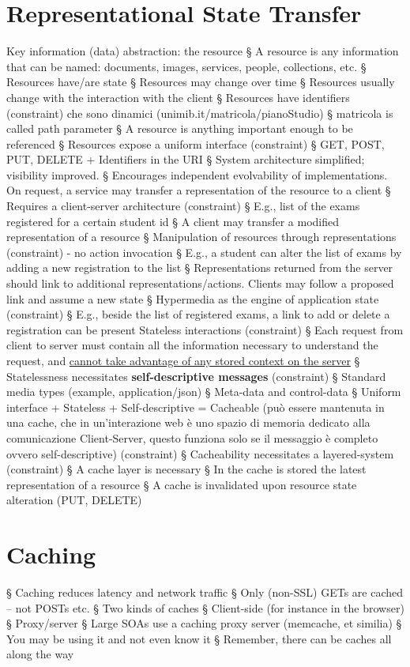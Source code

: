 \section{Representational State Transfer}
Key information (data) abstraction: the resource
§ A resource is any information that can be named: documents, images, services, people, collections, etc.
§ Resources have/are state
§ Resources may change over time
§ Resources usually change with the interaction with the client
§ Resources have identifiers (constraint) che sono dinamici (unimib.it/{matricola}/pianoStudio)
§ {matricola} is called path parameter
§ A resource is anything important enough to be referenced
§ Resources expose a uniform interface (constraint)
§ GET, POST, PUT, DELETE + Identifiers in the URI
§ System architecture simplified; visibility improved.
§ Encourages independent evolvability of implementations.
On request, a service may transfer a representation of the resource to a client
§ Requires a client-server architecture (constraint)
§ E.g., list of the exams registered for a certain student id
§ A client may transfer a modified representation of a resource
§ Manipulation of resources through representations (constraint) - no action invocation
§ E.g., a student can alter the list of exams by adding a new registration to the list
§ Representations returned from the server should link to additional representations/actions. Clients may
follow a proposed link and assume a new state
§ Hypermedia as the engine of application state (constraint)
§ E.g., beside the list of registered exams, a link to add or delete a registration can be present
Stateless interactions (constraint)
§ Each request from client to server must contain all the information necessary to understand the request, and \underline{cannot
take advantage of any stored context on the server}
§ Statelessness necessitates \textbf{self-descriptive messages} (constraint)
§ Standard media types (example, application/json)
§ Meta-data and control-data
§ Uniform interface + Stateless + Self-descriptive = Cacheable (può essere mantenuta in una cache, che in un'interazione web è uno spazio di memoria dedicato alla comunicazione Client-Server, questo funziona solo se il messaggio è completo ovvero self-descriptive) (constraint)
§ Cacheability necessitates a layered-system (constraint)
§ A cache layer is necessary
§ In the cache is stored the latest representation of a resource
§ A cache is invalidated upon resource state alteration (PUT, DELETE)

\section{Caching}
§ Caching reduces latency and network traffic
§ Only (non-SSL) GETs are cached – not POSTs etc.
§ Two kinds of caches
§ Client-side (for instance in the browser)
§ Proxy/server
§ Large SOAs use a caching proxy server (memcache, et similia)
§ You may be using it and not even know it
§ Remember, there can be caches all along the way

